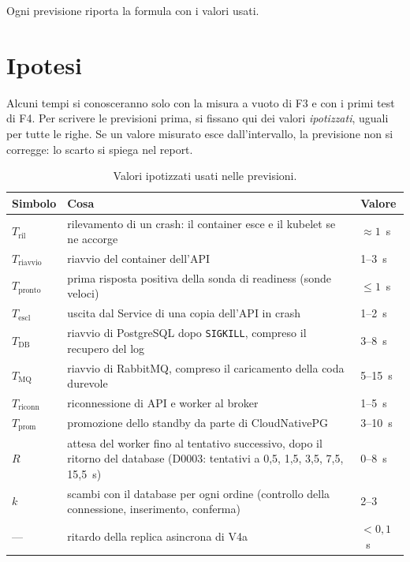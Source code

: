 Ogni previsione riporta la formula con i valori usati.

\section{Ipotesi}
\label{sec:ipotesi}

Alcuni tempi si conosceranno solo con la misura a vuoto di F3 e con i primi test di F4. Per scrivere le previsioni prima, si fissano qui dei valori \emph{ipotizzati}, uguali per tutte le righe. Se un valore misurato esce dall'intervallo, la previsione non si corregge: lo scarto si spiega nel report.

\begin{table}[htbp]
\centering
\caption{Valori ipotizzati usati nelle previsioni.}
\label{tab:ipotesi}
\begin{tabularx}{\linewidth}{@{}lLl@{}}
\toprule
\textbf{Simbolo} & \textbf{Cosa} & \textbf{Valore} \\
\midrule
$T_{\text{ril}}$ & rilevamento di un crash: il container esce e il kubelet se ne accorge & $\approx 1$~s \\
$T_{\text{riavvio}}$ & riavvio del container dell'API & 1--3~s \\
$T_{\text{pronto}}$ & prima risposta positiva della sonda di readiness (sonde veloci) & $\le 1$~s \\
$T_{\text{escl}}$ & uscita dal Service di una copia dell'API in crash & 1--2~s \\
$T_{\text{DB}}$ & riavvio di PostgreSQL dopo \texttt{SIGKILL}, compreso il recupero del log & 3--8~s \\
$T_{\text{MQ}}$ & riavvio di RabbitMQ, compreso il caricamento della coda durevole & 5--15~s \\
$T_{\text{riconn}}$ & riconnessione di API e worker al broker & 1--5~s \\
$T_{\text{prom}}$ & promozione dello standby da parte di CloudNativePG & 3--10~s \\
$R$ & attesa del worker fino al tentativo successivo, dopo il ritorno del database (D0003: tentativi a 0,5, 1,5, 3,5, 7,5, 15,5~s) & 0--8~s \\
$k$ & scambi con il database per ogni ordine (controllo della connessione, inserimento, conferma) & 2--3 \\
--- & ritardo della replica asincrona di V4a & $< 0{,}1$~s \\
\bottomrule
\end{tabularx}
\end{table}


